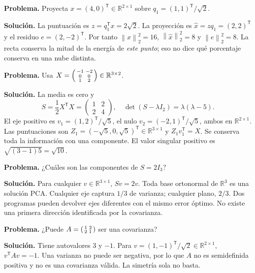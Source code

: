 \documentclass[11pt,a4paper]{article}
\newcommand{\R}{\mathbb R}
\newcommand{\T}{^{\mathsf T}}
\newcommand{\norm}[1]{\left\lVert #1\right\rVert}
\theoremstyle{definition}
\begin{document}
\begin{ejemplo}
\textbf{Problema.} Proyecta $x=(4,0)\T\in\R^{2\times1}$ sobre $q_1=(1,1)\T/\sqrt2$.

\textbf{Solución.} La puntuación es $z=q_1\T x=2\sqrt2$. La proyección es $\widehat x=zq_1=(2,2)\T$ y el residuo $e=(2,-2)\T$. Por tanto $\norm{x}_2^2=16$, $\norm{\widehat x}_2^2=8$ y $\norm e_2^2=8$. La recta conserva la mitad de la energía de \emph{este punto}; eso no dice qué porcentaje conserva en una nube distinta.
\end{ejemplo}
\begin{ejemplo}
\textbf{Problema.} Usa $X=\begin{psmallmatrix}-1&-2\\0&0\\1&2\end{psmallmatrix}\in\R^{3\times2}$.

\textbf{Solución.} La media es cero y
\[
S=\frac12X\T X=\begin{pmatrix}1&2\\2&4\end{pmatrix},\quad
\det(S-\lambda I_2)=\lambda(\lambda-5).
\]
El eje positivo es $v_1=(1,2)\T/\sqrt5$, el nulo $v_2=(-2,1)\T/\sqrt5$, ambos en $\R^{2\times1}$. Las puntuaciones son $Z_1=(-\sqrt5,0,\sqrt5)\T\in\R^{3\times1}$ y $Z_1v_1\T=X$. Se conserva toda la información con una componente. El valor singular positivo es $\sqrt{(3-1)5}=\sqrt{10}$.
\end{ejemplo}
\begin{ejemplo}
\textbf{Problema.} ¿Cuáles son las componentes de $S=2I_3$?

\textbf{Solución.} Para cualquier $v\in\R^{3\times1}$, $Sv=2v$. Toda base ortonormal de $\R^3$ es una solución PCA. Cualquier eje captura $1/3$ de varianza; cualquier plano, $2/3$. Dos programas pueden devolver ejes diferentes con el mismo error óptimo. No existe una primera dirección identificada por la covarianza.
\end{ejemplo}
\begin{ejemplo}
\textbf{Problema.} ¿Puede $A=\begin{psmallmatrix}1&2\\2&1\end{psmallmatrix}$ ser una covarianza?

\textbf{Solución.} Tiene autovalores $3$ y $-1$. Para $v=(1,-1)\T/\sqrt2\in\R^{2\times1}$, $v\T Av=-1$. Una varianza no puede ser negativa, por lo que $A$ no es semidefinida positiva y no es una covarianza válida. La simetría sola no basta.
\end{ejemplo}
\end{document}
